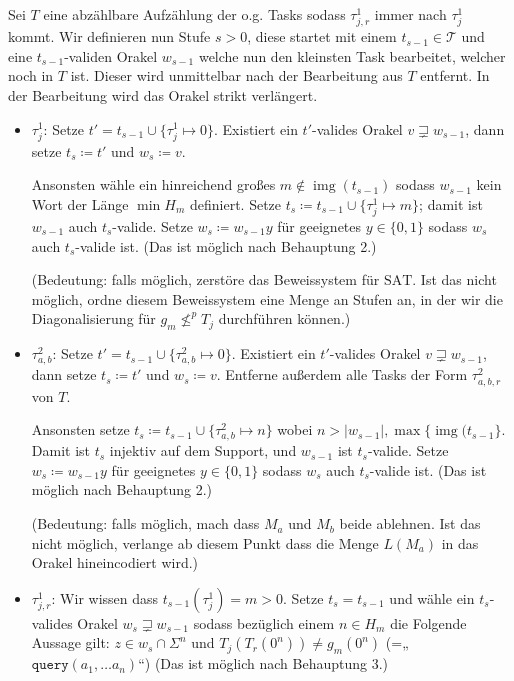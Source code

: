 \documentclass[nofonts]{uebung}
\def\SAT{\ensuremath{\mathrm{SAT}}}
\DeclareMathOperator{\img}{img}
\begin{document}
Sei $T$ eine abzählbare Aufzählung der o.g. Tasks sodass $\tau^1_{j,r}$ immer nach $\tau^1_{j}$ kommt.
Wir definieren nun Stufe $s>0$, diese startet mit einem $t_{s-1}\in\mathcal T$ und eine $t_{s-1}$-validen Orakel $w_{s-1}$ welche nun den kleinsten Task bearbeitet, welcher noch in $T$ ist. Dieser wird unmittelbar nach der Bearbeitung aus $T$ entfernt. In der Bearbeitung wird das Orakel strikt verlängert.
\begin{itemize}

    \item $\tau^1_j$: Setze $t'=t_{s-1}\cup\{\tau^1_j\mapsto 0\}$. Existiert ein $t'$-valides Orakel $v\sqsupsetneq w_{s-1}$, dann setze $t_s\coloneqq t'$ und $w_s\coloneqq v$.

        Ansonsten wähle ein hinreichend großes $m\not\in \img(t_{s-1})$ sodass $w_{s-1}$ kein Wort der Länge $\min H_m$ definiert. Setze $t_s\coloneqq t_{s-1}\cup \{ \tau^1_{j}\mapsto m \}$; damit ist $w_{s-1}$ auch $t_s$-valide. Setze $w_s\coloneqq w_{s-1}y$ für geeignetes $y\in\{0,1\}$ sodass $w_s$ auch $t_s$-valide ist. (Das ist möglich nach Behauptung 2.)

        (Bedeutung: falls möglich, zerstöre das Beweissystem für \SAT. Ist das nicht möglich, ordne diesem Beweissystem eine Menge an Stufen an, in der wir die Diagonalisierung für $g_m \not\leq^p T_j$ durchführen können.)


    \item $\tau^2_{a,b}$: Setze $t'=t_{s-1}\cup\{\tau^2_{a,b}\mapsto 0\}$. Existiert ein $t'$-valides Orakel $v\sqsupsetneq w_{s-1}$, dann setze $t_s\coloneqq t'$ und $w_s\coloneqq v$. Entferne außerdem alle Tasks der Form $\tau^2_{a,b,r}$ von $T$.

        Ansonsten setze $t_s\coloneqq t_{s-1}\cup \{ \tau^2_{a,b}\mapsto n \}$ wobei $n>|w_{s-1}|,\max\{ \img(t_{s-1} \}$.
        Damit ist $t_s$ injektiv auf dem Support, und $w_{s-1}$ ist $t_s$-valide.
        Setze $w_s\coloneqq w_{s-1}y$ für geeignetes $y\in\{0,1\}$ sodass $w_s$ auch $t_s$-valide ist. (Das ist möglich nach Behauptung 2.)

        (Bedeutung: falls möglich, mach dass $M_a$ und $M_b$ beide ablehnen. Ist das nicht möglich, verlange ab diesem Punkt dass die Menge $L(M_a)$ in das Orakel hineincodiert wird.)

    \item $\tau^1_{j,r}$: Wir wissen dass $t_{s-1}(\tau^1_{j})=m>0$. Setze $t_s=t_{s-1}$ und wähle ein $t_s$-valides Orakel $w_s\sqsupsetneq w_{s-1}$ sodass bezüglich einem $n\in H_m$ die Folgende Aussage gilt: $z\in w_s\cap\Sigma^n$ und $T_j(T_r(0^n))\neq g_m(0^n)$ (=„$\mathtt{query}(a_1, \dots a_n)$“)  (Das ist möglich nach Behauptung 3.)

\end{itemize}
\end{document}
